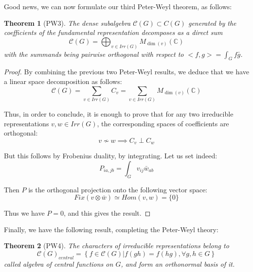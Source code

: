 \documentclass[12pt]{amsbook}
\newtheorem{theorem}{Theorem}[chapter]
\begin{document}
Good news, we can now formulate our third Peter-Weyl theorem, as follows:


\begin{theorem}[PW3]
The dense subalgebra $\mathcal C(G)\subset C(G)$ generated by the coefficients of the fundamental representation decomposes as a direct sum 
$$\mathcal C(G)=\bigoplus_{v\in Irr(G)}M_{\dim(v)}(\mathbb C)$$
with the summands being pairwise orthogonal with respect to $<f,g>=\int_Gf\bar{g}$.
\end{theorem}

\begin{proof}
By combining the previous two Peter-Weyl results, we deduce that we have a linear space decomposition as follows:
$$\mathcal C(G)
=\sum_{v\in Irr(G)}C_v
=\sum_{v\in Irr(G)}M_{\dim(v)}(\mathbb C)$$

Thus, in order to conclude, it is enough to prove that for any two irreducible representations $v,w\in Irr(G)$, the corresponding spaces of coefficients are orthogonal:
$$v\not\sim w\implies C_v\perp C_w$$ 

But this follows by Frobenius duality, by integrating. Let us set indeed:
$$P_{ia,jb}=\int_Gv_{ij}\bar{w}_{ab}$$

Then $P$ is the orthogonal projection onto the following vector space:
$$Fix(v\otimes\bar{w})
\simeq Hom(v,w)
=\{0\}$$

Thus we have $P=0$, and this gives the result.
\end{proof}

Finally, we have the following result, completing the Peter-Weyl theory:


\begin{theorem}[PW4]
The characters of irreducible representations belong to
$$\mathcal C(G)_{central}=\left\{f\in\mathcal C(G)\Big|f(gh)=f(hg),\forall g,h\in G\right\}$$
called algebra of central functions on $G$, and form an orthonormal basis of it.
\end{theorem}
\end{document}
